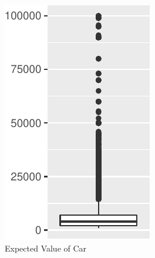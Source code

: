 \begin{figure}[H]
\begin{subfigure}{.24\textwidth}
  \includegraphics[width=\linewidth]{exploration_files/figure-latex/dist_boxplots-3.pdf}
  \caption{Expected Value of Car}
\end{subfigure}
\begin{subfigure}{.24\textwidth}
  \centering

\end{subfigure}
\end{figure}
